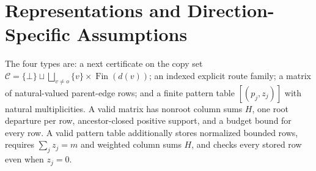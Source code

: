 \documentclass[11pt]{article}
\theoremstyle{remark}
\begin{document}
\section{Representations and Direction-Specific Assumptions}

The four types are: a next certificate on the copy set
$\mathcal C=\{\bot\}\sqcup\bigsqcup_{v\neq o}\{v\}\times\operatorname{Fin}(d(v))$;
an indexed explicit route family; a matrix of natural-valued parent-edge rows;
and a finite pattern table $[(p_j,z_j)]$ with natural multiplicities.
A valid matrix has nonroot column sums $H$, one root departure per row,
ancestor-closed positive support, and a budget bound for every row.
A valid pattern table additionally stores normalized bounded rows,
requires $\sum_jz_j=m$ and weighted column sums $H$, and checks every stored row even when $z_j=0$.
\end{document}
